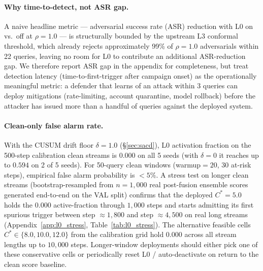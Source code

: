 \begin{table}[h]
\centering
\small

\caption{%
  Campaign detection across stream scenarios (5 seeds). The
  headline metric is mean time-to-detect; clean-only L0 activation fraction
  is 0.000 on all 5 seeds with the CUSUM drift floor $\delta{=}1.0$.
}
\label{tab:campaign}
\end{table}

\paragraph{Why time-to-detect, not ASR gap.}
A naive headline metric ---
adversarial success rate (ASR) reduction with L0 on vs.\ off at
$\rho{=}1.0$ --- is structurally bounded by the upstream L3 conformal
threshold, which already rejects approximately 99\% of $\rho{=}1.0$
adversarials within 22 queries, leaving no room for L0 to contribute an
additional ASR-reduction gap. We therefore report ASR gap in the appendix
for completeness, but treat detection latency (time-to-first-trigger after
campaign onset) as the operationally meaningful metric: a defender that
learns of an attack within 3 queries can deploy mitigations
(rate-limiting, account quarantine, model rollback) before the attacker
has issued more than a handful of queries against the deployed system.

\paragraph{Clean-only false alarm rate.}
With the CUSUM drift floor $\delta{=}1.0$ (\S\ref{sec:sacd}), L0 activation
fraction on the 500-step calibration clean streams is $0.000$ on all 5 seeds
(with $\delta{=}0$ it reaches up to $0.594$ on 2 of 5 seeds). For 50-query
clean windows (warmup$=20$, 30
at-risk steps), empirical false alarm probability is $< 5\%$.
A stress test on longer clean streams (bootstrap-resampled from
$n{=}1{,}000$ real post-fusion ensemble scores generated end-to-end on
the VAL split) confirms that the deployed $C^*=5.0$ holds the
$0.000$ active-fraction through $1{,}000$ steps and starts admitting
its first spurious trigger between step $\approx 1{,}800$ and step
$\approx 4{,}500$ on real long streams
(Appendix~\ref{app:l0_stress}, Table~\ref{tab:l0_stress}). The
alternative feasible cells $C^* \in \{8.0, 10.0, 12.0\}$ from the
calibration grid hold $0.000$ across all stream lengths up to
$10{,}000$ steps. Longer-window deployments should either pick one of
these conservative cells or periodically reset L0 / auto-deactivate on
return to the clean score baseline.


